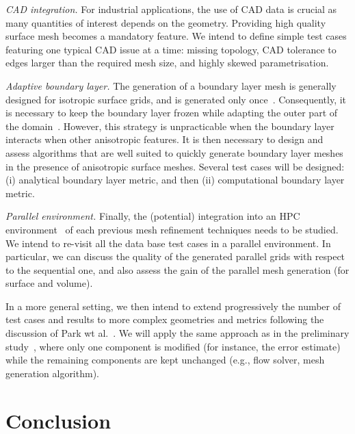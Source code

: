 \documentclass[3p,times,procedia,number]{elsarticle}
\begin{document}
\emph{CAD integration.\;}
For industrial applications, the use of CAD data is crucial as many quantities of interest
depends on the geometry. Providing high quality surface mesh becomes a mandatory feature.
We intend to define simple test cases featuring one typical CAD issue at a time:
missing topology,
CAD tolerance to edges larger than the required mesh size,
and highly skewed parametrisation.

\emph{Adaptive boundary layer.\;}
The generation of a boundary layer mesh is generally designed for isotropic surface grids,
and is generated only once~\cite{pirzadeh-advancing-layer,loseille-lohner-imr21-robust-bl-gen}.
Consequently, it is necessary to keep the boundary layer frozen while adapting
the outer part of the domain~\cite{park-carlson-turbulent-output-adapt-aiaa}.
However, this strategy is unpracticable when the boundary layer
interacts when other anisotropic features.
It is then necessary to design and assess algorithms that are well suited to quickly generate boundary layer meshes
in the presence of anisotropic surface meshes. Several test cases will be designed:
(i) analytical boundary layer metric, and then (ii) computational boundary layer metric. 

\emph{Parallel environment.\;}
Finally, the (potential) integration into an HPC environment~\cite{jansson-hoffman-jansson-siamjsc-2012-para-adapt-fe-cfd} of each previous mesh refinement techniques needs to be studied.
We intend to re-visit all the data base test cases in a parallel environment.
In particular,
we can discuss the quality of the generated parallel grids with respect to the sequential one,
and also assess the gain of the parallel mesh generation (for surface and volume).

In a more general setting, we then intend to extend progressively the number of test cases and results to more complex geometries and metrics
following the discussion of Park wt al.~\cite{park-unstruct-adapt-status-cfd2030}.
We will apply the same approach as in the preliminary study~\cite{park-loseille-krakos-michal-adapt-decomposition},
where only one component is modified (for instance, the error estimate) while the remaining
components are kept unchanged (e.g., flow solver, mesh generation algorithm).

\section{Conclusion}
\end{document}

